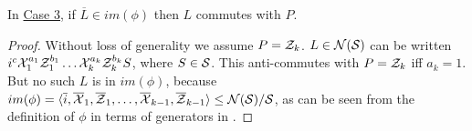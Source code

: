 \begin{lemma}\label{lem:if_in_im_phi_then_commutes_with_P}
    In \hyperref[thm:stabilizer_group_update_measurement:case3]{Case 3}, if $\overline{L} \in im(\phi)$ then $L$ commutes with $P$.
    \begin{proof}
        Without loss of generality we assume $P = \mathcal{Z}_k$.
        $L \in \mathcal{N}(\mathcal{S})$ can be written $i^c \mathcal{X}_1^{a_1} \mathcal{Z}_1^{b_1} \ldots \mathcal{X}_k^{a_k} \mathcal{Z}_k^{b_k} S$, where $S \in \mathcal{S}$.
        This anti-commutes with $P = \mathcal{Z}_k$ iff $a_k = 1$.
        But no such $L$ is in $im(\phi)$, because $im(\phi) = \langle \overline{i}, \overline{\mathcal{X}}_1, \overline{\mathcal{Z}}_1, \ldots, \overline{\mathcal{X}}_{k-1}, \overline{\mathcal{Z}}_{k-1} \rangle \leq \mathcal{N}(\mathcal{S})/\mathcal{S}$, as can be seen from the definition of $\phi$ in terms of generators in .
    \end{proof}
\end{lemma}

